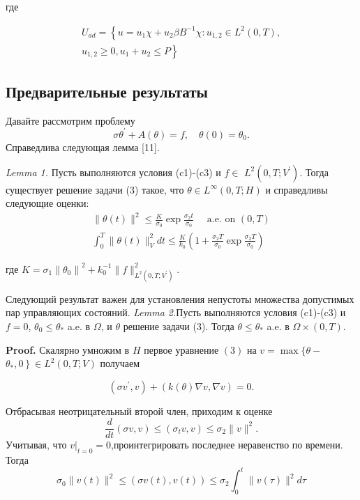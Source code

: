 где

\[
    \begin{array}{r}
        U_{a d}=\left\{u=u_{1} \chi+u_{2} \beta B^{-1}
        \chi: u_{1,2} \in L^{2}(0, T),\right. \\
        \left.u_{1,2} \geq 0, u_{1}+u_{2} \leq P\right\}
    \end{array}
\]

\subsection{Предварительные результаты}
\label{subsec:ch3:sec2:subsec4}
Давайте рассмотрим проблему
\[
    \sigma \theta^{\prime}+A(\theta)=f, \quad \theta(0)=\theta_{0}.
\]
Справедлива следующая лемма [11].

\textit{Lemma 1.}
Пусть выполняются условия (c1)-(c3) и $f \in$ $L^{2}\left(0, T ; V^{\prime}\right)$.
Тогда существует решение задачи (3) такое, что $\theta \in L^{\infty}(0, T ; H)$
и справедливы следующие оценки:
\[
    \begin{gathered}
        \|\theta(t)\|^{2} \leq \frac{K}{\sigma_{0}} \exp \frac{\sigma_{2} t}{\sigma_{0}}
        \quad \text { a.e. on }(0, T) \\
        \int_{0}^{T}\|\theta(t)\|_{V}^{2} d t \leq
        \frac{K}{k_{0}}\left(1+\frac{\sigma_{2} T}{\sigma_{0}} \exp
        \frac{\sigma_{2} T}{\sigma_{0}}\right)
    \end{gathered}
\]

где $K=\sigma_{1}\left\|\theta_{0}\right\|^{2}
+ k_{0}^{-1}\|f\|_{L^{2}\left(0, T; V^{\prime}\right)}^{2}$.

Следующий результат важен для установления непустоты множества допустимых пар управляющих состояний.
\textit{Lemma 2.}Пусть выполняются условия (c1)-(c3) и
$f=0$, $\theta_{0} \leq \theta_{*}$ a.e. в $\Omega$, и $\theta$ решение задачи (3).
Тогда $\theta \leq \theta_{*}$ a.e. в $\Omega \times(0, T)$.

\textbf{Proof.}
Скалярно умножим в $H$ первое уравнение $(3)$ на
$v=\max \{\theta-$ $\left.\theta_{*}, 0\right\} \in L^{2}(0, T ; V)$ получаем

\[ \left(\sigma v^{\prime}, v\right)+(k(\theta) \nabla v, \nabla v)=0. \]

Отбрасывая неотрицательный второй член, приходим к оценке
\[ \frac{d}{d t}(\sigma v, v) \leq\left(\sigma_{t} v, v\right) \leq \sigma_{2}\|v\|^{2} . \]
Учитывая, что $\left.v\right|_{t=0}=0$,проинтегрировать последнее неравенство по времени.
Тогда
\[ \sigma_{0}\|v(t)\|^{2} \leq(\sigma v(t), v(t)) \leq \sigma_{2} \int_{0}^{t}\|v(\tau)\|^{2} d \tau \]

